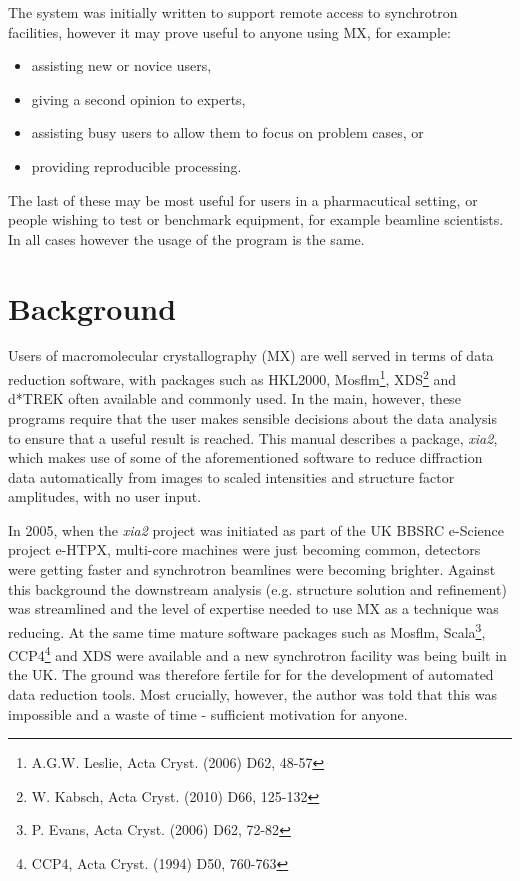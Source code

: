 \documentclass[a4paper, 11pt]{article}
\begin{document}
The system was initially written to support remote access to synchrotron 
facilities, however it may prove useful to anyone using MX, for example:

\begin{itemize}
\item{assisting new or novice users,}
\item{giving a second opinion to experts,}
\item{assisting busy users to allow them to focus on problem cases, or}
\item{providing reproducible processing.}
\end{itemize}

\noindent
The last of these may be most useful for users in a pharmacutical setting,
or people wishing to test or benchmark equipment, for example beamline 
scientists. In all cases however the usage of the program is the same.

\section{Background}

Users of macromolecular crystallography (MX) are well served in terms of
data reduction software, with packages such as HKL2000, 
Mosflm\footnote{A.G.W. Leslie, Acta Cryst. (2006) D62, 48-57},
XDS\footnote{W. Kabsch, Acta Cryst. (2010) D66, 125-132} and 
d*TREK often available and commonly used. In the main, however, these
programs require that the user makes sensible decisions about the data 
analysis to ensure that a useful result is reached. This manual describes
a package, \emph{xia2}, which makes use of some of the aforementioned 
software to reduce diffraction data automatically from images to scaled 
intensities and structure factor amplitudes, with no user input.

In 2005, when the \emph{xia2} project was initiated as part of the UK BBSRC
e-Science project e-HTPX, multi-core machines were just becoming common, 
detectors were getting faster and synchrotron beamlines were becoming 
brighter. Against this background the downstream analysis (e.g. structure 
solution and refinement) was streamlined and the level of expertise needed
to use MX as a technique was reducing. At the same time mature software
packages such as Mosflm, 
Scala\footnote{P. Evans, Acta Cryst. (2006) D62, 72-82}, 
CCP4\footnote{CCP4, Acta Cryst. (1994) D50, 760-763} 
and XDS were available and a new 
synchrotron facility was being built in the UK. The ground was therefore
fertile for for the development of automated data reduction tools. Most 
crucially, however, the author was told that this was impossible and a 
waste of time - sufficient motivation for anyone.
\end{document}
